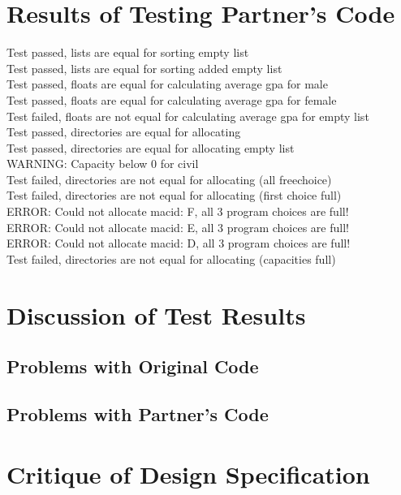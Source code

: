 \documentclass[12pt]{article}
\begin{document}
\section{Results of Testing Partner's Code}

Test passed, lists are equal for sorting empty list\\
Test passed, lists are equal for sorting added empty list\\
Test passed, floats are equal for calculating average gpa for male\\
Test passed, floats are equal for calculating average gpa for female\\
Test failed, floats are not equal for calculating average gpa for empty list\\
Test passed, directories are equal for allocating\\
Test passed, directories are equal for allocating empty list\\
WARNING: Capacity below 0 for civil\\
Test failed, directories are not equal for allocating (all freechoice)\\
Test failed, directories are not equal for allocating (first choice full)\\
ERROR: Could not allocate macid: F, all 3 program choices are full!\\
ERROR: Could not allocate macid: E, all 3 program choices are full!\\
ERROR: Could not allocate macid: D, all 3 program choices are full!\\
Test failed, directories are not equal for allocating (capacities full)\\


\section{Discussion of Test Results}

\subsection{Problems with Original Code}

\subsection{Problems with Partner's Code}

\section{Critique of Design Specification}
\end{document}
